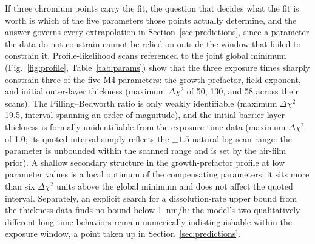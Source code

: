 \documentclass[a4paper,fleqn]{cas-sc}
\begin{document}
If three chromium points carry the fit, the question that decides what
the fit is worth is which of the five parameters those points actually
determine, and the answer governs every extrapolation in
Section~\ref{sec:predictions}, since a parameter the data do not
constrain cannot be relied on outside the window that failed to
constrain it. Profile-likelihood scans referenced to the joint global
minimum (Fig.~\ref{fig:profile}, Table~\ref{tab:params}) show that the
three exposure times sharply constrain three of the five M4 parameters:
the growth prefactor, field exponent, and initial outer-layer thickness
(maximum $\Delta\chi^2$ of 50, 130, and 58 across their scans). The
Pilling--Bedworth ratio is only weakly identifiable (maximum
$\Delta\chi^2$ 19.5, interval spanning an order of magnitude), and the
initial barrier-layer thickness is formally unidentifiable from the
exposure-time data (maximum $\Delta\chi^2$ of 1.0; its quoted interval
simply reflects the $\pm1.5$ natural-log scan range: the parameter is
unbounded within the scanned range and is set by the air-film prior). A
shallow secondary structure in the growth-prefactor profile at low
parameter values is a local optimum of the compensating parameters; it
sits more than six $\Delta\chi^2$ units above the global minimum and
does not affect the quoted interval. Separately, an explicit search for
a dissolution-rate upper bound from the thickness data finds no bound
below 1~nm/h: the model's two qualitatively different long-time
behaviors remain numerically indistinguishable within the exposure
window, a point taken up in Section~\ref{sec:predictions}.
\end{document}
